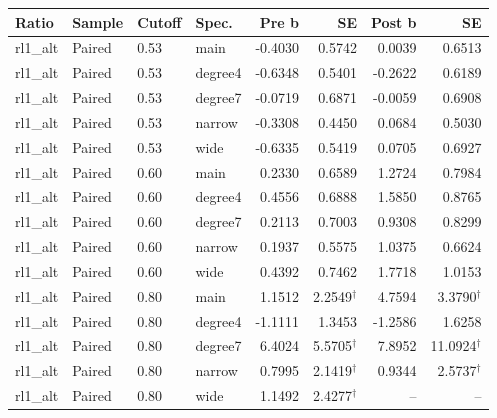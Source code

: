 \begin{threeparttable}
\begin{tabular}{llllrrrr}
\toprule
Ratio & Sample & Cutoff & Spec. & Pre b & SE & Post b & SE \\
\midrule
rl1\_alt & Paired & 0.53 & main & -0.4030 & 0.5742 & 0.0039 & 0.6513 \\
rl1\_alt & Paired & 0.53 & degree4 & -0.6348 & 0.5401 & -0.2622 & 0.6189 \\
rl1\_alt & Paired & 0.53 & degree7 & -0.0719 & 0.6871 & -0.0059 & 0.6908 \\
rl1\_alt & Paired & 0.53 & narrow & -0.3308 & 0.4450 & 0.0684 & 0.5030 \\
rl1\_alt & Paired & 0.53 & wide & -0.6335 & 0.5419 & 0.0705 & 0.6927 \\
rl1\_alt & Paired & 0.60 & main & 0.2330 & 0.6589 & 1.2724 & 0.7984 \\
rl1\_alt & Paired & 0.60 & degree4 & 0.4556 & 0.6888 & 1.5850 & 0.8765 \\
rl1\_alt & Paired & 0.60 & degree7 & 0.2113 & 0.7003 & 0.9308 & 0.8299 \\
rl1\_alt & Paired & 0.60 & narrow & 0.1937 & 0.5575 & 1.0375 & 0.6624 \\
rl1\_alt & Paired & 0.60 & wide & 0.4392 & 0.7462 & 1.7718 & 1.0153 \\
rl1\_alt & Paired & 0.80 & main & 1.1512 & 2.2549$^{\dagger}$ & 4.7594 & 3.3790$^{\dagger}$ \\
rl1\_alt & Paired & 0.80 & degree4 & -1.1111 & 1.3453 & -1.2586 & 1.6258 \\
rl1\_alt & Paired & 0.80 & degree7 & 6.4024 & 5.5705$^{\dagger}$ & 7.8952 & 11.0924$^{\dagger}$ \\
rl1\_alt & Paired & 0.80 & narrow & 0.7995 & 2.1419$^{\dagger}$ & 0.9344 & 2.5737$^{\dagger}$ \\
rl1\_alt & Paired & 0.80 & wide & 1.1492 & 2.4277$^{\dagger}$ & -- & -- \\
\bottomrule
\end{tabular}
\begin{tablenotes}[flushleft]
\footnotesize

\end{tablenotes}
\end{threeparttable}

